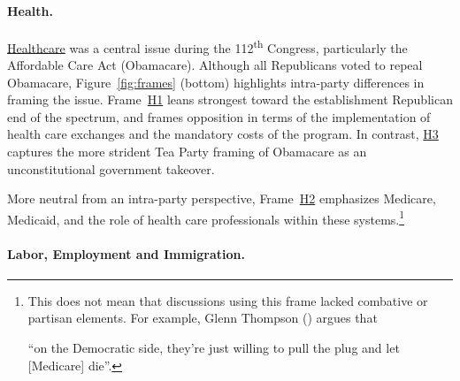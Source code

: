 \paragraph{Health.}

\underline{Healthcare} was a central issue during the 112\textsuperscript{th}
Congress, particularly the Affordable Care Act (Obamacare). Although all
Republicans voted to repeal Obamacare, Figure~\ref{fig:frames} (bottom) highlights
intra-party differences in framing the issue. Frame~\underline{H1} leans strongest toward
the establishment Republican end of the spectrum, and frames opposition in terms of
the implementation of health care exchanges and the mandatory costs of the
program. In contrast, \underline{H3} captures the more strident Tea Party framing of Obamacare as an unconstitutional government takeover.
More neutral from an intra-party perspective,
Frame~\underline{H2} emphasizes Medicare, Medicaid, and the role of health
care professionals within these systems.\footnote{This does not mean that discussions using this frame
  lacked combative or partisan elements. For example, Glenn Thompson
  () argues that  ``on the
  Democratic side, they're just willing to pull the plug and let
  [Medicare] die''. }


\paragraph{Labor, Employment and Immigration.}

